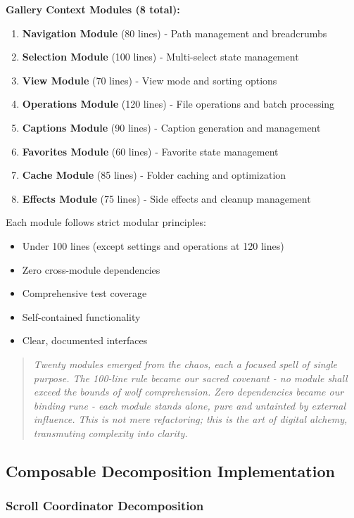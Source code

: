 \documentclass[11pt]{article}
\begin{document}
\textbf{Gallery Context Modules (8 total):}
\begin{enumerate}
\item \textbf{Navigation Module} (80 lines) - Path management and breadcrumbs
\item \textbf{Selection Module} (100 lines) - Multi-select state management
\item \textbf{View Module} (70 lines) - View mode and sorting options
\item \textbf{Operations Module} (120 lines) - File operations and batch processing
\item \textbf{Captions Module} (90 lines) - Caption generation and management
\item \textbf{Favorites Module} (60 lines) - Favorite state management
\item \textbf{Cache Module} (85 lines) - Folder caching and optimization
\item \textbf{Effects Module} (75 lines) - Side effects and cleanup management
\end{enumerate}

Each module follows strict modular principles:
\begin{itemize}
\item Under 100 lines (except settings and operations at 120 lines)
\item Zero cross-module dependencies
\item Comprehensive test coverage
\item Self-contained functionality
\item Clear, documented interfaces
\end{itemize}

\begin{quote}
\emph{Twenty modules emerged from the chaos, each a focused spell of single purpose. The 100-line rule became our sacred covenant - no module shall exceed the bounds of wolf comprehension. Zero dependencies became our binding rune - each module stands alone, pure and untainted by external influence. This is not mere refactoring; this is the art of digital alchemy, transmuting complexity into clarity.}
\end{quote}

\subsection{Composable Decomposition Implementation}

\subsubsection{Scroll Coordinator Decomposition}
\end{document}
